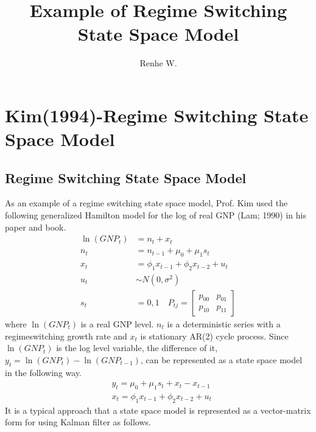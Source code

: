 \documentclass[UTF8,12pt]{ctexart}
\title{Example of Regime Switching State Space Model}
\author{Renhe W.}
\date{ }
\numberwithin{equation}{section}%
\begin{document}
	
	\maketitle
	\tableofcontents%
	\listoffigures%
	\listoftables%
	\newpage
	\kaishu
	

	\section{Kim(1994)-Regime Switching State Space Model}
	
	\subsection{Regime Switching State Space Model}
	As an example of a regime switching state space model, Prof. Kim used the following generalized Hamilton model for the log of real GNP (Lam; 1990) in his paper and book.
	$$
	\begin{aligned}
		\ln \left(G N P_t\right) & =n_t+x_t \\
		n_t & =n_{t-1}+\mu_0+\mu_1 s_t \\
		x_t & =\phi_1 x_{t-1}+\phi_2 x_{t-2}+u_t \\
		u_t & \sim N\left(0, \sigma^2\right) \\
		s_t & =0,1 \quad P_{t j}=\left[\begin{array}{ll}
			p_{00} & p_{01} \\
			p_{10} & p_{11}
		\end{array}\right]
	\end{aligned}
	$$
	where $\ln \left(G N P_t\right)$ is a real GNP level. $n_t$ is a deterministic series with a regimeswitching growth rate and $x_t$ is stationary AR(2) cycle process.
	Since $\ln \left(G N P_t\right)$ is the log level variable, the difference of it, $y_t=\ln \left(G N P_t\right)-\ln \left(G N P_{t-1}\right)$, can be represented as a state space model in the following way.
	$$
	\begin{aligned}
		& y_t=\mu_0+\mu_1 s_t+x_t-x_{t-1} \\
		& x_t=\phi_1 x_{t-1}+\phi_2 x_{t-2}+u_t
	\end{aligned}
	$$
	It is a typical approach that a state space model is represented as a vector-matrix form for using Kalman filter as follows.
\end{document}
